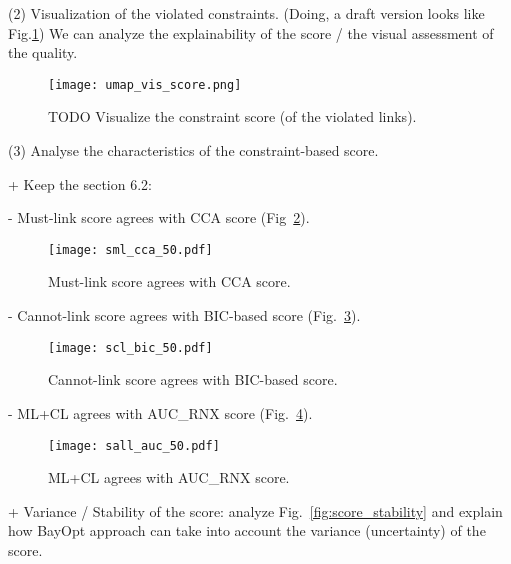 \vspace{8pt} \par
(2) Visualization of the violated constraints. (Doing, a draft version looks like
Fig.\ref{fig:viz-score})
We can analyze the explainability of the score / the visual assessment of the quality.

\begin{figure}
\texttt{[image: umap\_vis\_score.png]}
\caption{TODO Visualize the constraint score (of the violated links).}\label{fig:viz-score}
\end{figure}


\vspace{9pt} \par
(3) Analyse the characteristics of the constraint-based score.

+ Keep the section 6.2:

\hspace{10pt }- Must-link score agrees with CCA score (Fig~\ref{fig:sml}).
\begin{figure}
\centering
\texttt{[image: sml\_cca\_50.pdf]}
\caption{Must-link score agrees with CCA score.}\label{fig:sml}
\end{figure}

\hspace{10pt }- Cannot-link score agrees with BIC-based score (Fig.~\ref{fig:scl}).
\begin{figure}
\centering
\texttt{[image: scl\_bic\_50.pdf]}
\caption{Cannot-link score agrees with BIC-based score.}\label{fig:scl}
\end{figure}

\hspace{10pt }- ML+CL agrees with AUC\_RNX score (Fig.~\ref{fig:sall}).
\begin{figure}
\centering
\texttt{[image: sall\_auc\_50.pdf]}
\caption{ML+CL agrees with AUC\_RNX score.}\label{fig:sall}
\end{figure}

\vspace{8pt} \par
+ Variance / Stability of the score: analyze Fig.~\ref{fig:score_stability} and explain how BayOpt approach can take into account the variance (uncertainty) of the score.

